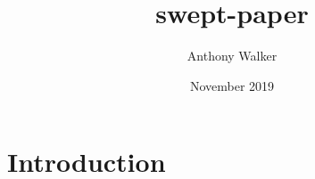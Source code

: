 \documentclass{article}
\title{swept-paper}
\author{Anthony Walker}
\date{November 2019}
\begin{document}
\maketitle

\section{Introduction}
\end{document}
